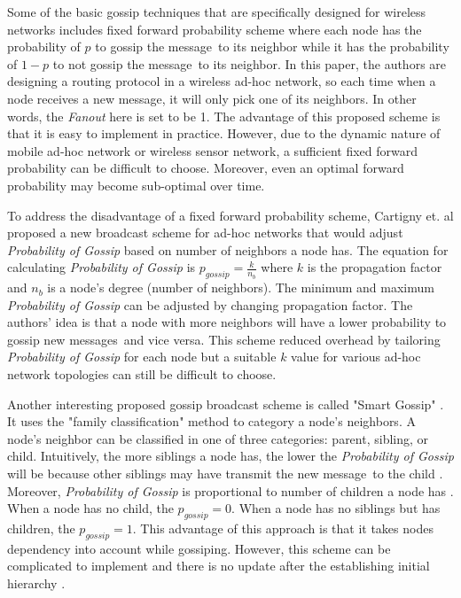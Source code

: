 \documentclass[onehalf,11pt]{beavtex}
\newcommand{\pog}{Probability of Gossip}
\newcommand{\msgs}{messages}
\newcommand{\msg}{message}
\begin{document}
Some of the basic gossip techniques that are specifically designed for wireless networks includes fixed forward probability scheme \cite{haas2006gossip} where each node has the probability of $p$ to gossip the \msg ~to its neighbor while it has the probability of $1-p$ to not gossip the \msg ~to its neighbor. In this paper, the authors are designing a routing protocol in a wireless ad-hoc network, so each time when a node receives a new \msg, it will only pick one of its neighbors. In other words, the \emph{Fanout} here is set to be 1. The advantage of this proposed scheme is that it is easy to implement in practice. However, due to the dynamic nature of mobile ad-hoc network or wireless sensor network, a sufficient fixed forward probability can be difficult to choose. Moreover, even an optimal forward probability may become sub-optimal over time. 

To address the disadvantage of a fixed forward probability scheme, Cartigny et. al \cite{cartigny2003border} proposed a new broadcast scheme for ad-hoc networks that would adjust \emph{\pog} based on number of neighbors a node has. The equation for calculating \emph{\pog} is $p_{gossip}=\frac{k}{n_b}$ where $k$ is the propagation factor and $n_b$ is a node's degree (number of neighbors). The minimum and maximum \emph{\pog} can be adjusted by changing propagation factor. The authors' idea is that a node with more neighbors will have a lower probability to gossip new \msgs ~and vice versa. This scheme reduced overhead by tailoring \emph{\pog} for each node but a suitable $k$ value for various ad-hoc network topologies can still be difficult to choose. 

Another interesting proposed gossip broadcast scheme is called "Smart Gossip" \cite{smart}. It uses the "family classification" method to category a node's neighbors. A node's neighbor can be classified in one of three categories: parent, sibling, or child. Intuitively, the more siblings a node has, the lower the \emph{\pog} will be because other siblings may have transmit the new \msg ~to the child \cite{2015survey}. Moreover, \emph{\pog} is proportional to number of children a node has \cite{2015survey}. When a node has no child, the $p_{gossip}=0$. When a node has no siblings but has children, the $p_{gossip}=1$. This advantage of this approach is that it takes nodes dependency into account while gossiping. However, this scheme can be complicated to implement and there is no update after the establishing initial hierarchy \cite{2015survey}.
\end{document}
